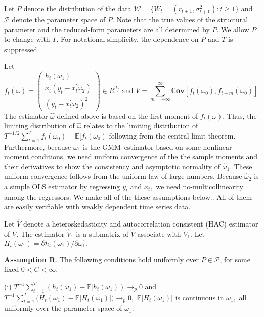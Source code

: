 \documentclass[11pt, letterpaper, twoside]{article}
\begin{document}
Let $P$ denote the distribution of the data $\mathcal{W}=\{W_{t}=(r_{t+1},%
\sigma _{t+1}^{2}):t\geq 1\}$ and $\mathcal{P}$ denote the parameter space
of $P$. Note that the true values of the structural parameter and the
reduced-form parameters are all determined by $P.$ We allow $P$ to change
with $T.$ For notational simplicity, the dependence on $P$ and $T$ is
suppressed.

Let 
\begin{equation}
f_{t}(\omega )=\left( 
\begin{array}{c}
h_{t}(\omega _{1}) \\ 
x_{t}(y_{t}-x_{t}^{\prime }\omega _{2}) \\ 
(y_{t}-x_{t}^{\prime }\omega _{2})^{2}%
\end{array}%
\right) \in R^{d_{f}}\text{ and }V=\sum_{m=-\infty }^{\infty }\mathbb{C}%
\mathbf{ov}[f_{t}(\omega _{0}),f_{t+m}(\omega _{0})].
\end{equation}%
The estimator $\widehat{\omega }$ defined above is based on the first moment
of $f_{t}(\omega ).$ Thus, the limiting distribution of $\widehat{\omega }$
relates to the limiting distribution of $T^{-1/2}\sum_{t=1}^{T}f_{t}(\omega
_{0})-\mathbb{E[}f_{t}(\omega _{0})$ following from the central limit
theorem. Furthermore, because $\omega _{1}$ is the GMM\ estimator based on
some nonlinear moment conditions, we need uniform convergence of the the
sample moments and their derivatives to show the consistency and asymptotic
normality of $\widehat{\omega }_{1}.$ These uniform convergence follows from
the uniform law of large numbers. Because $\widehat{\omega }_{2}$ is a
simple OLS estimator by regressing $y_{t}$ and $x_{t},$ we need
no-multicollinearity among the regressors. We make all of the these
assumptions below.. All of them are easily verifiable with weakly dependent
time series data.

Let $\widehat{V}$ denote a heteroskedasticity and autocorrelation consistent
(HAC) estimator of $V$. The estimator $\widehat{V}_{1}$ is a submatrix of $%
\widehat{V}$ associate with $V_{1}.$ Let $H_{t}(\omega _{1})=\partial
h_{t}(\omega _{1})/\partial \omega _{1}^{\prime }.$

\smallskip

\noindent \textbf{Assumption R}. The following conditions hold uniformly
over $P\in \mathcal{P}$, for some fixed $0<C<\infty .$

\noindent (i) $T^{-1}\sum_{t=1}^{T}(h_{t}(\omega _{1})-\mathbb{E[}%
h_{t}(\omega _{1}))\rightarrow _{p}0$ and $T^{-1}\sum_{t=1}^{T}(H_{t}(\omega
_{1})-\mathbb{E[}H_{t}(\omega _{1})\mathbb{])}\rightarrow _{p}0,$ $\mathbb{E[%
}H_{t}(\omega _{1})\mathbb{]}$ is continuous in $\omega _{1},$ all uniformly
over the parameter space of $\omega _{1}.$
\end{document}
